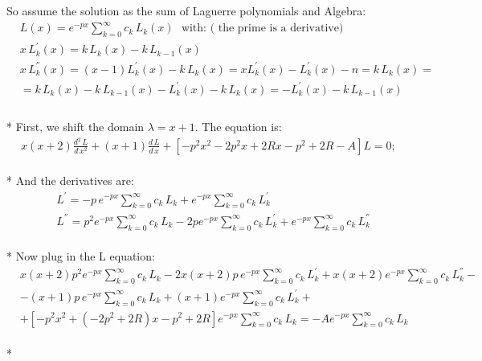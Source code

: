  So assume the solution as the sum of Laguerre polynomials and Algebra:
\begin{equation}
\begin{split}
& L(x) =  e^{-px}\sum_{k=0}^{\infty}{c_k\,L_k(x)}\,\,\text{ with: ( the prime is a derivative) } \\[.8em]
& x\,L_k^{'}(x) = k\,L_k(x)  - k\,L_{k-1}(x) \\[.8em]
& x\,L_k^{''}(x) = (x-1)L_k^{'}(x) - k\,L_k(x) = xL_k^{'}(x)-L_k^{'}(x) - n=k\,L_k(x) = \\[.8em] 
& = k\,L_k(x)  - k\,L_{k-1}(x) - L_k^{'}(x) - k\,L_k(x) = - L_k^{'}(x) - k\,L_{k-1}(x)\\[.8em]
\end{split}
\end{equation}\\*
First, we shift the domain $ \lambda = x + 1 $. The equation is:
\begin{equation}
\begin{split}
x(x +2)\frac{d^2\,L}{d\,x^2} + (x+1)\frac{d\,L}{d\,x} + \left[ -p^2x^2  -2p^2x + 2Rx - p^2 + 2R - A \right] L = 0;
\end{split}
\end{equation}\\*
And the derivatives are:
\begin{equation}
\begin{split}
& L^{'} =  -p\,e^{-px}\sum_{k=0}^{\infty}{c_k\,L_k} + e^{-px}\sum_{k=0}^{\infty}{c_k\,L_k^{'}} \\[.8em]
& L^{''} = p^2 e^{-px}\sum_{k=0}^{\infty}{c_k\,L_k} - 2 p e^{-px}\sum_{k=0}^{\infty}{c_k\,L_k^{'}} + e^{-px}\sum_{k=0}^{\infty}{c_k\,L_k^{''}}  
\end{split} 
\end{equation}\\*
Now plug in the L equation:
\begin{equation}
\begin{split}
& x(x +2)p^2 e^{-px}\sum_{k=0}^{\infty}{c_k\,L_k} - 2x(x +2)p\,e^{-px}\sum_{k=0}^{\infty}{c_k\,L_k^{'}} + x(x +2)e^{-px}\sum_{k=0}^{\infty}{c_k\,L_k^{''}} - \\[.8em]
& -(x+1)p\,e^{-px}\sum_{k=0}^{\infty}{c_k\,L_k} + (x+1)e^{-px}\sum_{k=0}^{\infty}{c_k\,L_k^{'}} + \\[.8em]
& + \left[  -p^2x^2 + (-2p^2 + 2R)x - p^2 + 2R \right] e^{-px}\sum_{k=0}^{\infty}{c_k\,L_k} = -A  e^{-px}\sum_{k=0}^{\infty}{c_k\,L_k}
\end{split}
\end{equation}\\*
